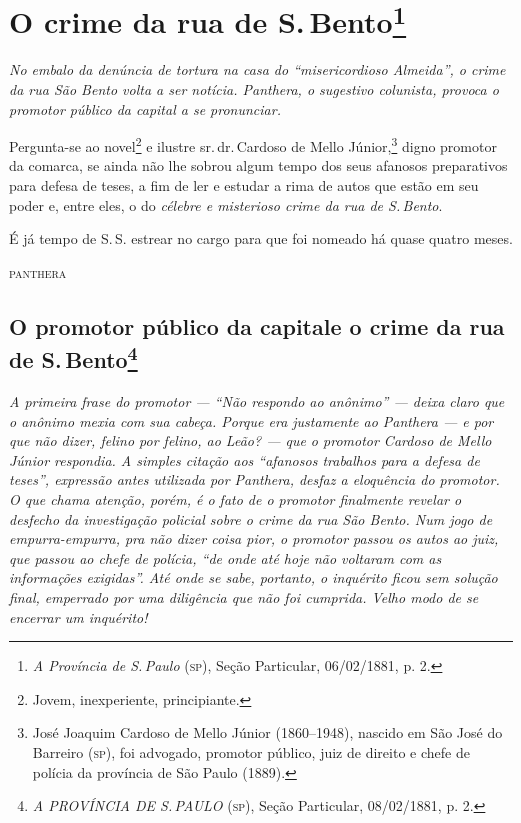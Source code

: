 \chapter{O crime da rua de S.\,Bento\footnote{\emph{A Província
  de S.\,Paulo} (\textsc{sp}), Seção Particular, 06/02/1881, p. 2.}}

\begin{resumo}
\emph{No embalo da denúncia de tortura na casa do ``misericordioso
Almeida'', o crime da rua São Bento volta a ser notícia. Panthera,
o sugestivo colunista, provoca o promotor público da capital a se
pronunciar. }
\end{resumo}

Pergunta-se ao novel\footnote{Jovem, inexperiente, principiante.} e
ilustre sr.\,dr.\,Cardoso de Mello Júnior,\footnote{José Joaquim Cardoso \label{jjcmj}
  de Mello Júnior (1860--1948), nascido em São José do Barreiro (\textsc{sp}), foi
  advogado, promotor público, juiz de direito e chefe de polícia da
  província de São Paulo (1889).}
digno promotor da comarca,
se ainda não lhe sobrou algum tempo dos seus afanosos preparativos para
defesa de teses, a fim de ler e estudar a rima de autos que estão em seu
poder e, entre eles, o do \emph{célebre e misterioso crime da rua de S.\,Bento}.

É já tempo de S.\,S. estrear no cargo para que foi nomeado há quase
quatro meses.

\hfill\textsc{panthera}

\pagebreak
\section{O promotor público da capital\break e o crime da rua de S.\,Bento\protect\footnote{\MakeUppercase
\emph{\MakeUppercase{A} \MakeUppercase{P}rovíncia de \MakeUppercase{S.\,P}aulo} (\textsc{sp}), \MakeUppercase{S}eção \MakeUppercase{P}articular, 08/02/1881, p. 2.}}

\begin{resumo}
\emph{A primeira frase do promotor --- ``Não respondo ao anônimo'' --- deixa
claro que o anônimo mexia com sua cabeça. Porque era justamente ao
Panthera --- e por que não dizer, felino por felino, ao
Leão? --- que o promotor Cardoso de Mello Júnior respondia. A
simples citação aos ``afanosos trabalhos para a defesa de teses'',
expressão antes utilizada por Panthera, desfaz a eloquência do
promotor. O que chama atenção, porém, é o fato de o promotor finalmente
revelar o desfecho da investigação policial sobre o crime da rua São
Bento. Num jogo de empurra-empurra, pra não dizer coisa pior, o promotor
passou os autos ao juiz, que passou ao chefe de polícia, ``de onde até
hoje não voltaram com as informações exigidas''. Até onde se sabe,
portanto, o inquérito ficou sem solução final, emperrado por uma
diligência que não foi cumprida. Velho modo de se encerrar um
inquérito!}
\end{resumo}

